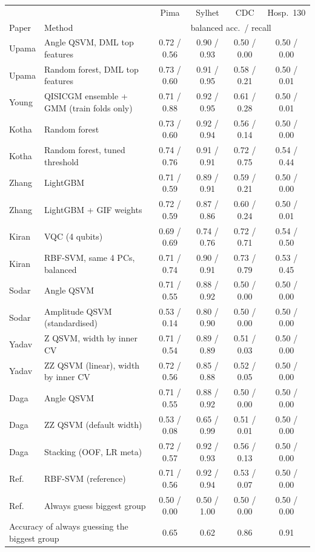 ﻿\begin{tabular}{llcccc}
\toprule & & Pima & Sylhet & CDC & Hosp.\ 130\\
Paper & Method & \multicolumn{4}{c}{balanced acc.\ / recall}\\\midrule
Upama & Angle QSVM, DML top features & 0.72 / 0.56 & 0.90 / 0.93 & 0.50 / 0.00 & 0.50 / 0.00\\
Upama & Random forest, DML top features & 0.73 / 0.60 & 0.91 / 0.95 & 0.58 / 0.21 & 0.50 / 0.01\\
\midrule
Young & QISICGM ensemble + GMM (train folds only) & 0.71 / 0.88 & 0.92 / 0.95 & 0.61 / 0.28 & 0.50 / 0.01\\
\midrule
Kotha & Random forest & 0.73 / 0.60 & 0.92 / 0.94 & 0.56 / 0.14 & 0.50 / 0.00\\
Kotha & Random forest, tuned threshold & 0.74 / 0.76 & 0.91 / 0.91 & 0.72 / 0.75 & 0.54 / 0.44\\
\midrule
Zhang & LightGBM & 0.71 / 0.59 & 0.89 / 0.91 & 0.59 / 0.21 & 0.50 / 0.00\\
Zhang & LightGBM + GIF weights & 0.72 / 0.59 & 0.87 / 0.86 & 0.60 / 0.24 & 0.50 / 0.01\\
\midrule
Kiran & VQC (4 qubits) & 0.69 / 0.69 & 0.74 / 0.76 & 0.72 / 0.71 & 0.54 / 0.50\\
Kiran & RBF-SVM, same 4 PCs, balanced & 0.71 / 0.74 & 0.90 / 0.91 & 0.73 / 0.79 & 0.53 / 0.45\\
\midrule
Sodar & Angle QSVM & 0.71 / 0.55 & 0.88 / 0.92 & 0.50 / 0.00 & 0.50 / 0.00\\
Sodar & Amplitude QSVM (standardised) & 0.53 / 0.14 & 0.80 / 0.90 & 0.50 / 0.00 & 0.50 / 0.00\\
\midrule
Yadav & Z QSVM, width by inner CV & 0.71 / 0.54 & 0.89 / 0.89 & 0.51 / 0.03 & 0.50 / 0.00\\
Yadav & ZZ QSVM (linear), width by inner CV & 0.72 / 0.56 & 0.85 / 0.88 & 0.52 / 0.05 & 0.50 / 0.00\\
\midrule
Daga & Angle QSVM & 0.71 / 0.55 & 0.88 / 0.92 & 0.50 / 0.00 & 0.50 / 0.00\\
Daga & ZZ QSVM (default width) & 0.53 / 0.08 & 0.65 / 0.99 & 0.51 / 0.01 & 0.50 / 0.00\\
Daga & Stacking (OOF, LR meta) & 0.72 / 0.57 & 0.92 / 0.93 & 0.56 / 0.13 & 0.50 / 0.00\\
\midrule
Ref. & RBF-SVM (reference) & 0.71 / 0.56 & 0.92 / 0.94 & 0.53 / 0.07 & 0.50 / 0.00\\
Ref. & Always guess biggest group & 0.50 / 0.00 & 0.50 / 1.00 & 0.50 / 0.00 & 0.50 / 0.00\\
\midrule
\multicolumn{2}{l}{Accuracy of always guessing the biggest group} & 0.65 & 0.62 & 0.86 & 0.91\\
\bottomrule\end{tabular}
